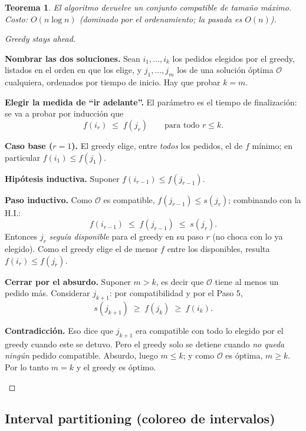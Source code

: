 \documentclass[11pt,a4paper]{article}
\theoremstyle{plain}
\newtheorem{teorema}{Teorema}[section]
\theoremstyle{definition}
\theoremstyle{remark}
\begin{document}
\begin{teorema}
El algoritmo devuelve un conjunto compatible de tamaño máximo. Costo: $O(n\log n)$
(dominado por el ordenamiento; la pasada es $O(n)$).
\end{teorema}
\begin{proof}[Greedy stays ahead]
\begin{pasos}
\item \textbf{Nombrar las dos soluciones.} Sean $i_1,\dots,i_k$ los pedidos elegidos por
el greedy, listados en el orden en que los elige, y $j_1,\dots,j_m$ los de una solución
óptima $\mathcal{O}$ cualquiera, ordenados por tiempo de inicio. Hay que probar $k=m$.
\item \textbf{Elegir la medida de ``ir adelante''.} El parámetro es el tiempo de
finalización: se va a probar por inducción que
\[ f(i_r)\;\le\; f(j_r) \qquad \text{para todo } r\le k. \]
\item \textbf{Caso base ($r=1$).} El greedy elige, entre \emph{todos} los pedidos, el de
$f$ mínimo; en particular $f(i_1)\le f(j_1)$.
\item \textbf{Hipótesis inductiva.} Suponer $f(i_{r-1})\le f(j_{r-1})$.
\item \textbf{Paso inductivo.} Como $\mathcal{O}$ es compatible,
$f(j_{r-1})\le s(j_r)$; combinando con la H.I.:
\[ f(i_{r-1})\;\le\; f(j_{r-1})\;\le\; s(j_r). \]
Entonces $j_r$ \emph{seguía disponible} para el greedy en su paso $r$ (no choca con lo
ya elegido). Como el greedy elige el de menor $f$ entre los disponibles, resulta
$f(i_r)\le f(j_r)$.
\item \textbf{Cerrar por el absurdo.} Suponer $m>k$, es decir que $\mathcal{O}$ tiene
al menos un pedido más. Considerar $j_{k+1}$: por compatibilidad y por el Paso 5,
\[ s(j_{k+1})\;\ge\; f(j_k)\;\ge\; f(i_k). \]
\item \textbf{Contradicción.} Eso dice que $j_{k+1}$ era compatible con todo lo elegido
por el greedy cuando este se detuvo. Pero el greedy solo se detiene cuando \emph{no
queda ningún} pedido compatible. Absurdo, luego $m\le k$; y como $\mathcal{O}$ es
óptima, $m\ge k$. Por lo tanto $m=k$ y el greedy es óptimo. \qedhere
\end{pasos}
\end{proof}

\subsection{Interval partitioning (coloreo de intervalos)}
\end{document}
